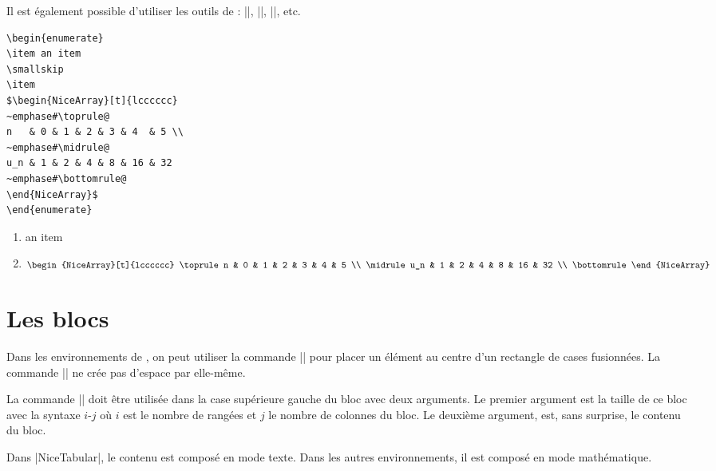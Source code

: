 \documentclass[dvipsnames]{article}%
\begin{document}
\bigskip
Il est également possible d'utiliser les outils de : |\toprule|,
|\bottomrule|, |\midrule|, etc.\par\nobreak

\smallskip
\begin{BVerbatim}[baseline=c,boxwidth=9cm]
\begin{enumerate}
\item an item
\smallskip
\item 
$\begin{NiceArray}[t]{lcccccc}
~emphase#\toprule@
n   & 0 & 1 & 2 & 3 & 4  & 5 \\
~emphase#\midrule@
u_n & 1 & 2 & 4 & 8 & 16 & 32 
~emphase#\bottomrule@
\end{NiceArray}$
\end{enumerate}
\end{BVerbatim}
\begin{minipage}{5cm}
\begin{enumerate}
\item an item
\smallskip
\item 
$\begin{NiceArray}[t]{lcccccc}
\toprule
n   & 0 & 1 & 2 & 3 & 4  & 5  \\
\midrule
u_n & 1 & 2 & 4 & 8 & 16 & 32 \\
\bottomrule
\end{NiceArray}$
\end{enumerate}
\end{minipage}



\section{Les blocs}

\label{Block}
Dans les environnements de , on peut utiliser la commande
|\Block| pour placer un élément au centre d'un rectangle de cases fusionnées. La
commande |\Block| ne crée pas d'espace par elle-même.

La commande |\Block| doit être utilisée dans la case supérieure gauche du bloc
avec deux arguments. Le premier argument est la taille de ce bloc avec la
syntaxe $i$-$j$ où $i$ est le nombre de rangées et $j$ le nombre de colonnes du
bloc. Le deuxième argument, est, sans surprise, le contenu du bloc.

Dans |{NiceTabular}|, le contenu est composé en mode texte. Dans les autres
environnements, il est composé en mode mathématique.
\end{document}
